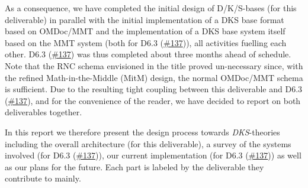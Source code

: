 As a consequence, we have completed the initial design of D/K/S-bases
(for this deliverable) in parallel with the initial implementation of a
DKS base format based on OMDoc/MMT and the implementation of a DKS base
system itself based on the MMT system (both for D6.3
(\href{https://github.com/OpenDreamKit/OpenDreamKit/issues/137}{\#137})),
all activities fuelling each other. D6.3
(\href{https://github.com/OpenDreamKit/OpenDreamKit/issues/137}{\#137})
was thus completed about three months ahead of schedule. Note that the
RNC schema envisioned in the title proved un-necessary since, with the
refined Math-in-the-Middle (MitM) design, the normal OMDoc/MMT schema is
sufficient. Due to the resulting tight coupling between this deliverable
and D6.3
(\href{https://github.com/OpenDreamKit/OpenDreamKit/issues/137}{\#137}),
and for the convenience of the reader, we have decided to report on both
deliverables together.

In this report we therefore present the design process towards
\emph{DKS}-theories including the overall architecture (for this
deliverable), a survey of the systems involved (for D6.3
(\href{https://github.com/OpenDreamKit/OpenDreamKit/issues/137}{\#137})),
our current implementation (for D6.3
(\href{https://github.com/OpenDreamKit/OpenDreamKit/issues/137}{\#137}))
as well as our plans for the future. Each part is labeled by the
deliverable they contribute to mainly.
